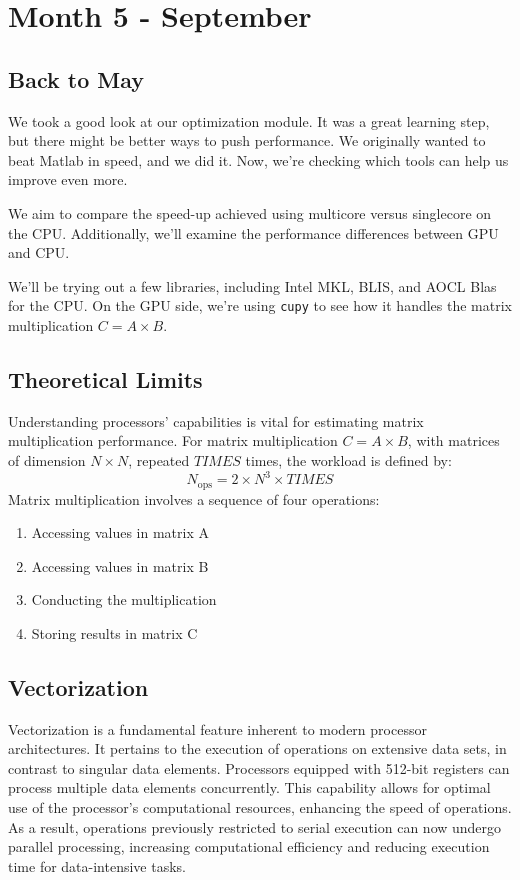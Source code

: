 \clearpage

\section{Month 5 - September}

\subsection*{Back to May}

We took a good look at our optimization module. It was a great learning step, but there might be better ways to push performance. We originally wanted to beat Matlab in speed, and we did it. Now, we're checking which tools can help us improve even more.

We aim to compare the speed-up achieved using multicore versus singlecore on the CPU. Additionally, we'll examine the performance differences between GPU and CPU.

We'll be trying out a few libraries, including Intel MKL, BLIS, and AOCL Blas for the CPU. On the GPU side, we're using \texttt{cupy} to see how it handles the matrix multiplication $C = A \times B$.


\subsection*{Theoretical Limits}
Understanding processors' capabilities is vital for estimating matrix multiplication performance. For matrix multiplication \(C = A \times B\), with matrices of dimension \(N \times N\), repeated \(TIMES\) times, the workload is defined by:
\begin{equation}
    N_{\text{ops}} = 2 \times N^3 \times TIMES
\end{equation}
Matrix multiplication involves a sequence of four operations:
\begin{enumerate}
    \item Accessing values in matrix A
    \item Accessing values in matrix B
    \item Conducting the multiplication
    \item Storing results in matrix C
\end{enumerate}

\subsection{Vectorization}
Vectorization is a fundamental feature inherent to modern processor architectures. It pertains to the execution of operations on extensive data sets, in contrast to singular data elements. Processors equipped with 512-bit registers can process multiple data elements concurrently. This capability allows for optimal use of the processor's computational resources, enhancing the speed of operations. As a result, operations previously restricted to serial execution can now undergo parallel processing, increasing computational efficiency and reducing execution time for data-intensive tasks.

